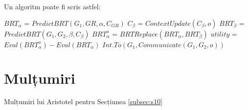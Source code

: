                                                                                                                                                                                                                                                                   
Un algoritm poate fi scris astfel:

\begin{algorithm}
 \caption{Commitment decision}
  \label{ftalg}
   \begin{algorithmic}
      \STATE $BRT_{\alpha}$ = $PredictBRT(G_{1},GR,\alpha,C_{GR})$
      \STATE $C_{\beta}$ = $ContextUpdate(C_{\beta},o)$
      \STATE $BRT_{\beta}$ = $PredictBRT(G_{1},G_{2},\beta,C_{\beta})$
      \STATE $BRT_{\alpha}^{o}$ = $BRTReplace(BRT_{\alpha},BRT_{\beta})$
      \STATE $utility$ = $Eval(BRT_{\alpha}^{o})-Eval(BRT_{\alpha})$
     \ENDIF
        \STATE $Int.To(G_{1},Communicate(G_{1},G_{2},o))$
      \ENDIF
   \end{algorithmic}
\end{algorithm}

\section*{Mulțumiri}
Mulțumiri lui Aristotel pentru Secțiunea \ref{subsec:s10} %
